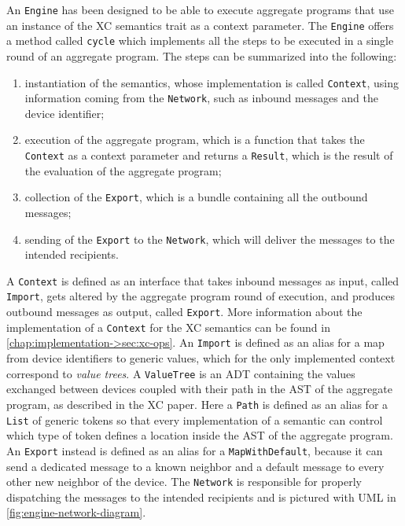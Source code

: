 An \texttt{Engine} has been designed to be able to execute aggregate programs that use an instance of the \ac{XC} semantics trait as a context parameter.
%
The \texttt{Engine} offers a method called \texttt{cycle} which implements all the steps to be executed in a single round of an aggregate program.
%
The steps can be summarized into the following:
\begin{enumerate}
    \item instantiation of the semantics, whose implementation is called \texttt{Context}, using information coming from the \texttt{Network}, such as inbound messages and the device identifier;
    \item execution of the aggregate program, which is a function that takes the \texttt{Context} as a context parameter and returns a \texttt{Result}, which is the result of the evaluation of the aggregate program;
    \item collection of the \texttt{Export}, which is a bundle containing all the outbound messages;
    \item sending of the \texttt{Export} to the \texttt{Network}, which will deliver the messages to the intended recipients.
\end{enumerate}
%
A \texttt{Context} is defined as an interface that takes inbound messages as input, called \texttt{Import}, gets altered by the aggregate program round of execution, and produces outbound messages as output, called \texttt{Export}.
%
More information about the implementation of a \texttt{Context} for the \ac{XC} semantics can be found in \cref{chap:implementation->sec:xc-ops}.
%
An \texttt{Import} is defined as an alias for a map from device identifiers to generic values, which for the only implemented context correspond to \textit{value trees}.
%
A \texttt{ValueTree} is an \ac{ADT} containing the values exchanged between devices coupled with their path in the \ac{AST} of the aggregate program, as described in the \ac{XC} paper\cite{xc}.
%
Here a \texttt{Path} is defined as an alias for a \texttt{List} of generic tokens so that every implementation of a semantic can control which type of token defines a location inside the \ac{AST} of the aggregate program.
%
An \texttt{Export} instead is defined as an alias for a \texttt{MapWithDefault}, because it can send a dedicated message to a known neighbor and a default message to every other new neighbor of the device.
%
The \texttt{Network} is responsible for properly dispatching the messages to the intended recipients and is pictured with \ac{UML} in \cref{fig:engine-network-diagram}.

